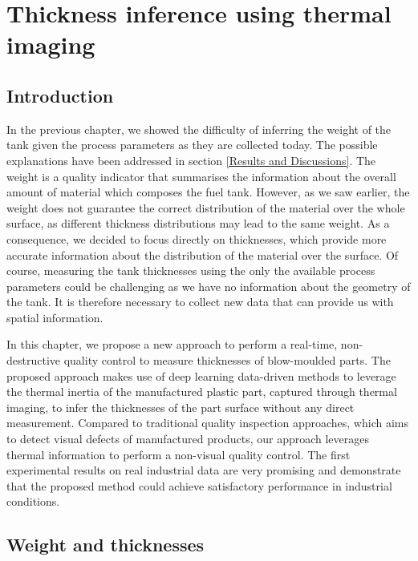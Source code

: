 \chapter{Thickness inference using thermal imaging} \label{Thickness inference using thermal imaging}
\minitoc


\section{Introduction}

In the previous chapter, we showed the difficulty of inferring the weight of the tank given the process parameters as they are collected today. The possible explanations have been addressed in section \ref{Results and Discussions}. The weight is a quality indicator that summarises the information about the overall amount of material which composes the fuel tank. However, as we saw earlier, the weight does not guarantee the correct distribution of the material over the whole surface, as different thickness distributions may lead to the same weight. As a consequence, we decided to focus directly on thicknesses, which provide more accurate information about the distribution of the material over the surface. Of course, measuring the tank thicknesses using the only the available process parameters could be challenging as we have no information about the geometry of the tank. It is therefore necessary to collect new data that can provide us with spatial information.

In this chapter, we propose a new approach to perform a real-time, non-destructive quality control to measure thicknesses of blow-moulded parts. The proposed approach makes use of deep learning data-driven methods to leverage the thermal inertia of the manufactured plastic part, captured through thermal imaging, to infer the thicknesses of the part surface without any direct measurement. Compared to traditional quality inspection approaches, which aims to detect visual defects of manufactured products, our approach leverages thermal information to perform a non-visual quality control. The first experimental results on real industrial data are very promising and demonstrate that the proposed method could achieve satisfactory performance in industrial conditions.

\section{Weight and thicknesses}


